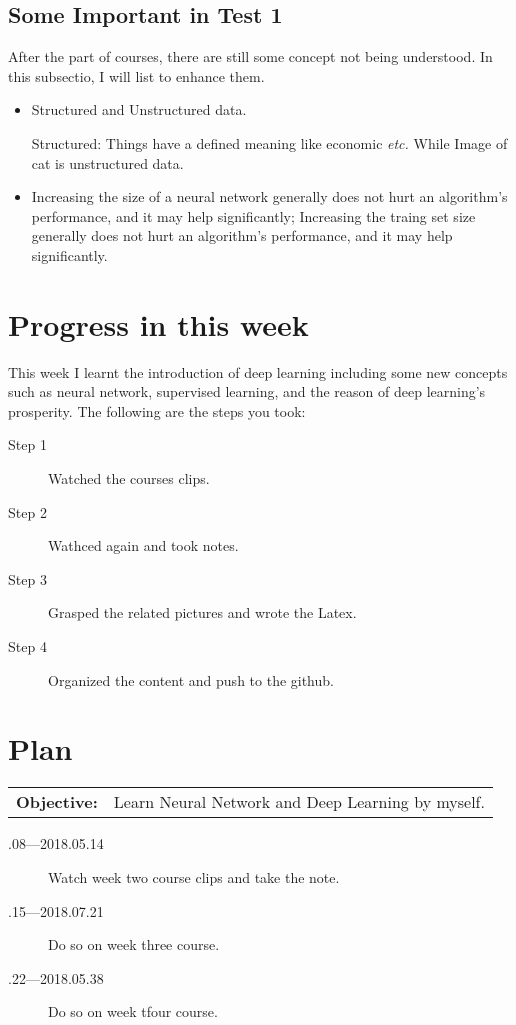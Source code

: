 \documentclass[a4paper]{article}
\begin{document}
\subsection{Some Important in Test 1}
After the part of courses, there are still some concept not being understood. In this subsectio, I will list to enhance them.
\begin{itemize}
\item Structured and Unstructured data.\par
 Structured: Things have a defined meaning like economic \emph{etc.} While Image of cat is unstructured data.
 \item Increasing the size of a neural network generally does not hurt an algorithm's performance, and it may help significantly; Increasing the traing set size generally does not hurt an algorithm's performance, and it may help significantly.
\end{itemize}

\section{Progress in this week}
This week I learnt the introduction of deep learning including some new concepts such as neural network, supervised learning, and the reason of deep learning's prosperity. The following are the steps you took:
\begin{description}
\item [Step 1]
Watched the courses clips.
\item[Step 2]
Wathced again and took notes.
\item[Step 3]
Grasped the related pictures and wrote the Latex.
\item[Step 4]
Organized the content and push to the github.
\end{description}


\section{Plan}

\begin{tabular}{rl}
	\textbf{Objective:} & Learn Neural Network and Deep Learning by myself. \\
\end{tabular}

\begin{description}
    \item[.08---2018.05.14] Watch week two course clips and take the note.
    \item[.15---2018.07.21] Do so on week three course.
    \item[.22---2018.05.38] Do so on week tfour course.
\end{description}



\end{document}
